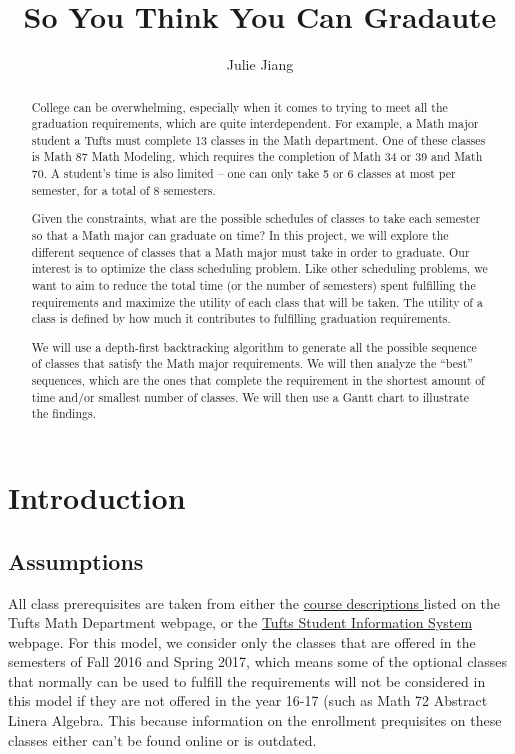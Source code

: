\documentclass[11pt, oneside]{article}
\title{So You Think You Can Gradaute\vspace{0em}}
\author{Julie Jiang}
\begin{document}
\maketitle
\begin{abstract}
College can be overwhelming, especially when it comes to trying to meet all the graduation requirements, which are quite interdependent. For example, a Math major student a Tufts must complete 13 classes in the Math department. One of these classes is Math 87 Math Modeling, which requires the completion of Math 34 or 39 and Math 70. A student's time is also limited -- one can only take 5 or 6 classes at most per semester, for a total of 8 semesters. 


Given the constraints, what are the possible schedules of classes to take each semester so that a Math major can graduate on time? In this project, we will explore the different sequence of classes that a Math major must take in order to graduate. Our interest is to optimize the class scheduling problem. Like other scheduling problems, we want to aim to reduce the total time (or the number of semesters) spent fulfilling the requirements and maximize the utility of each class that will be taken. The utility of a class is defined by how much it contributes to fulfilling graduation requirements. 

We will use a depth-first backtracking algorithm to generate all the possible sequence of classes that satisfy the Math major requirements. We will then analyze the ``best'' sequences, which are the ones that complete the requirement in the shortest amount of time and/or smallest number of classes. We will then use a Gantt chart to illustrate the findings.

\end{abstract}
\section{Introduction}


\subsection{Assumptions}
All class prerequisites are taken from either the \color{blue}\href{http://Math.tufts.edu/courses/}{course descriptions }\color{black}  listed on the Tufts Math Department webpage, or the \color{blue}\href{https://sis.uit.tufts.edu}{Tufts Student Information System }\color{black} webpage. For this model, we consider only the classes that are offered in the semesters of Fall 2016 and Spring 2017, which means some of the optional classes that normally can be used to fulfill the requirements will not be considered in this model if they are not offered in the year 16-17 (such as Math 72 Abstract Linera Algebra. This because information on the enrollment prequisites on these classes either can't be found online or is outdated. 
\end{document}
